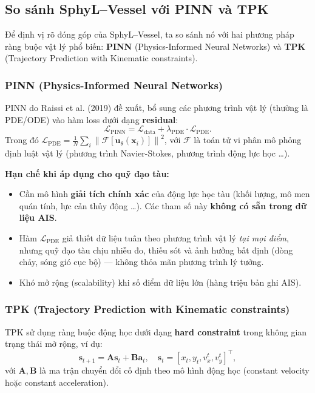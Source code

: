 \documentclass{IEEEtran}
\begin{document}
\subsection{So sánh SphyL--Vessel với PINN và TPK}\label{sec:compare-pinn-tpk}

Để định vị rõ đóng góp của SphyL--Vessel, ta so sánh nó với hai
phương pháp ràng buộc vật lý phổ biến: \textbf{PINN}
(Physics-Informed Neural Networks) và \textbf{TPK}
(Trajectory Prediction with Kinematic constraints).

\subsubsection{PINN (Physics-Informed Neural Networks)}
PINN do Raissi et al. (2019) đề xuất, bổ sung các phương trình
vật lý (thường là PDE/ODE) vào hàm loss dưới dạng \textbf{residual}:
\[
\mathcal{L}_{\text{PINN}} = \mathcal{L}_{\text{data}}
  + \lambda_{\text{PDE}} \cdot \mathcal{L}_{\text{PDE}}.
\]
Trong đó $\mathcal{L}_{\text{PDE}} = \frac{1}{N}\sum_i
\left\|\mathcal{F}[\mathbf{u}_\theta(\mathbf{x}_i)]\right\|^2$,
với $\mathcal{F}$ là toán tử vi phân mô phỏng định luật vật lý
(phương trình Navier-Stokes, phương trình động lực học \dots).

\textbf{Hạn chế khi áp dụng cho quỹ đạo tàu:}
\begin{itemize}
  \item Cần mô hình \textbf{giải tích chính xác} của động lực học tàu
        (khối lượng, mô men quán tính, lực cản thủy động \dots).
        Các tham số này \textbf{không có sẵn trong dữ liệu AIS}.
  \item Hàm $\mathcal{L}_{\text{PDE}}$ giả thiết dữ liệu tuân theo
        phương trình vật lý \textit{tại mọi điểm}, nhưng quỹ đạo tàu
        chịu nhiễu đo, thiếu sót và ảnh hưởng bất định (dòng chảy,
        sóng gió cục bộ) --- không thỏa mãn phương trình lý tưởng.
  \item Khó mở rộng (scalability) khi số điểm dữ liệu lớn
        (hàng triệu bản ghi AIS).
\end{itemize}

\subsubsection{TPK (Trajectory Prediction with Kinematic constraints)}
TPK sử dụng ràng buộc động học dưới dạng \textbf{hard constraint}
trong không gian trạng thái mở rộng, ví dụ:
\[
\mathbf{s}_{t+1} = \mathbf{A}\mathbf{s}_t + \mathbf{B}\mathbf{a}_t,
\quad
\mathbf{s}_t = [x_t, y_t, v_x^t, v_y^t]^\top,
\]
với $\mathbf{A}, \mathbf{B}$ là ma trận chuyển đổi cố định theo mô hình
động học (constant velocity hoặc constant acceleration).
\end{document}
